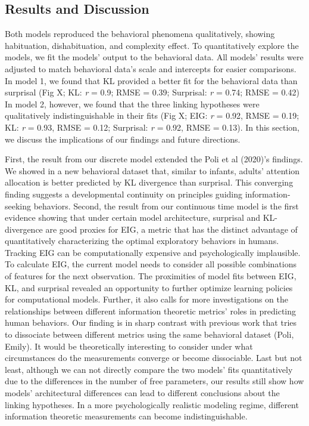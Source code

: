 \documentclass[10pt, letterpaper]{article}
\begin{document}
\hypertarget{results-and-discussion}{%
\subsection{Results and Discussion}\label{results-and-discussion}}

Both models reproduced the behavioral phenomena qualitatively, showing
habituation, dishabituation, and complexity effect. To quantitatively
explore the models, we fit the models' output to the behavioral data.
All models' results were adjusted to match behavioral data's scale and
intercepts for easier comparisons. In model 1, we found that KL provided
a better fit for the behavioral data than surprisal (Fig X; KL: \emph{r}
= 0.9; RMSE = 0.39; Surprisal: \emph{r} = 0.74; RMSE = 0.42) In model 2,
however, we found that the three linking hypotheses were qualitatively
indistinguishable in their fits (Fig X; EIG: \emph{r} = 0.92, RMSE =
0.19; KL: \emph{r} = 0.93, RMSE = 0.12; Surprisal: \emph{r} = 0.92, RMSE
= 0.13). In this section, we discuss the implications of our findings
and future directions.

First, the result from our discrete model extended the Poli et al
(2020)'s findings. We showed in a new behavioral dataset that, similar
to infants, adults' attention allocation is better predicted by KL
divergence than surprisal. This converging finding suggests a
developmental continuity on principles guiding information-seeking
behaviors. Second, the result from our continuous time model is the
first evidence showing that under certain model architecture, surprisal
and KL-divergence are good proxies for EIG, a metric that has the
distinct advantage of quantitatively characterizing the optimal
exploratory behaviors in humans. Tracking EIG can be computationally
expensive and psychologically implausible. To calculate EIG, the current
model needs to consider all possible combinations of features for the
next observation. The proximities of model fits between EIG, KL, and
surprisal revealed an opportunity to further optimize learning policies
for computational models. Further, it also calls for more investigations
on the relationships between different information theoretic metrics'
roles in predicting human behaviors. Our finding is in sharp contrast
with previous work that tries to dissociate between different metrics
using the same behavioral dataset (Poli, Emily). It would be
theoretically interesting to consider under what circumstances do the
measurements converge or become dissociable. Last but not least,
although we can not directly compare the two models' fits quantitatively
due to the differences in the number of free parameters, our results
still show how models' architectural differences can lead to different
conclusions about the linking hypotheses. In a more psychologically
realistic modeling regime, different information theoretic measurements
can become indistinguishable.
\end{document}
